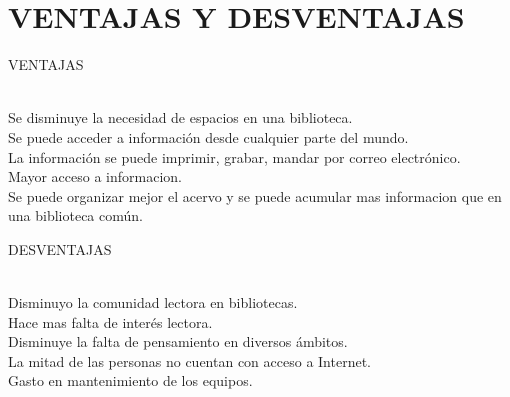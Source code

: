 \section{VENTAJAS Y DESVENTAJAS} 

\begin{enumerate}[7.]

	\begin{center}
	\item VENTAJAS
	\end{center}
  \\ Se disminuye la  necesidad de espacios en una biblioteca.  
  \\ Se puede acceder a información desde cualquier parte del mundo.  
  \\ La información se puede imprimir, grabar, mandar por correo electrónico. 
  \\ Mayor acceso a informacion. 
  \\ Se puede organizar mejor el acervo  y se puede acumular mas  informacion que en una biblioteca común.
  \\
	\begin{center}
	\item DESVENTAJAS
	\end{center} 
  \\ Disminuyo la comunidad lectora en bibliotecas. 
  \\ Hace mas falta de interés lectora. 
  \\ Disminuye la falta de pensamiento en diversos ámbitos.  
  \\ La mitad de las personas no cuentan con acceso a Internet. 
  \\ Gasto en mantenimiento de los equipos. 


\end{enumerate} 
